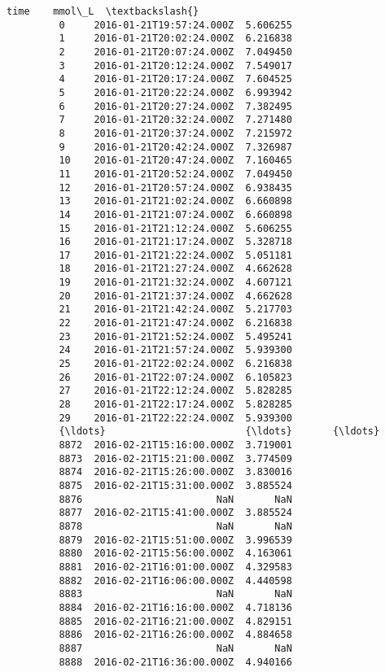 \documentclass[11pt]{article}
\begin{document}
\begin{Verbatim}[commandchars=\\\{\}]
                                   time    mmol\_L  \textbackslash{}
         0     2016-01-21T19:57:24.000Z  5.606255   
         1     2016-01-21T20:02:24.000Z  6.216838   
         2     2016-01-21T20:07:24.000Z  7.049450   
         3     2016-01-21T20:12:24.000Z  7.549017   
         4     2016-01-21T20:17:24.000Z  7.604525   
         5     2016-01-21T20:22:24.000Z  6.993942   
         6     2016-01-21T20:27:24.000Z  7.382495   
         7     2016-01-21T20:32:24.000Z  7.271480   
         8     2016-01-21T20:37:24.000Z  7.215972   
         9     2016-01-21T20:42:24.000Z  7.326987   
         10    2016-01-21T20:47:24.000Z  7.160465   
         11    2016-01-21T20:52:24.000Z  7.049450   
         12    2016-01-21T20:57:24.000Z  6.938435   
         13    2016-01-21T21:02:24.000Z  6.660898   
         14    2016-01-21T21:07:24.000Z  6.660898   
         15    2016-01-21T21:12:24.000Z  5.606255   
         16    2016-01-21T21:17:24.000Z  5.328718   
         17    2016-01-21T21:22:24.000Z  5.051181   
         18    2016-01-21T21:27:24.000Z  4.662628   
         19    2016-01-21T21:32:24.000Z  4.607121   
         20    2016-01-21T21:37:24.000Z  4.662628   
         21    2016-01-21T21:42:24.000Z  5.217703   
         22    2016-01-21T21:47:24.000Z  6.216838   
         23    2016-01-21T21:52:24.000Z  5.495241   
         24    2016-01-21T21:57:24.000Z  5.939300   
         25    2016-01-21T22:02:24.000Z  6.216838   
         26    2016-01-21T22:07:24.000Z  6.105823   
         27    2016-01-21T22:12:24.000Z  5.828285   
         28    2016-01-21T22:17:24.000Z  5.828285   
         29    2016-01-21T22:22:24.000Z  5.939300   
         {\ldots}                        {\ldots}       {\ldots}   
         8872  2016-02-21T15:16:00.000Z  3.719001   
         8873  2016-02-21T15:21:00.000Z  3.774509   
         8874  2016-02-21T15:26:00.000Z  3.830016   
         8875  2016-02-21T15:31:00.000Z  3.885524   
         8876                       NaN       NaN   
         8877  2016-02-21T15:41:00.000Z  3.885524   
         8878                       NaN       NaN   
         8879  2016-02-21T15:51:00.000Z  3.996539   
         8880  2016-02-21T15:56:00.000Z  4.163061   
         8881  2016-02-21T16:01:00.000Z  4.329583   
         8882  2016-02-21T16:06:00.000Z  4.440598   
         8883                       NaN       NaN   
         8884  2016-02-21T16:16:00.000Z  4.718136   
         8885  2016-02-21T16:21:00.000Z  4.829151   
         8886  2016-02-21T16:26:00.000Z  4.884658   
         8887                       NaN       NaN   
         8888  2016-02-21T16:36:00.000Z  4.940166   

\end{Verbatim}
\end{document}

